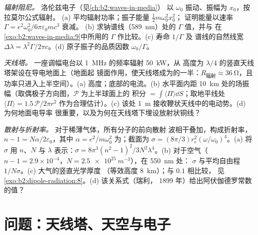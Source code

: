 \begin{exercise}[$\star\star\star$]\label{exo:b2:dipole-radiation:10}
\emph{辐射阻尼。} 洛伦兹电子（见\cref{ch:b2:waves-in-media}）
以 $\omega_0$ 振动、振幅为 $x_0$，按拉莫尔公式辐射。
(a) 平均辐射功率；振子能量 $\tfrac12m\omega_0^2x_0^2$；
证明能量以速率 $\Gamma = e^2\omega_0^2/6\pi\varepsilon_0mc^3$ 衰减。
(b) 求钠谱线（\qty{589}{nm}）处的 $\Gamma$ 值，并与
在\cref{exo:b2:waves-in-media:9}中所用的 $\Gamma$ 作比较。(c) 寿命 $1/\Gamma$ 及
谱线的自然线宽 $\Delta\lambda = \lambda^2\Gamma/2\pi c$。(d) 原子振子的品质因数
$\omega_0/\Gamma$。
\end{exercise}

\begin{exercise}[$\star\star\star$]\label{exo:b2:dipole-radiation:11}
\emph{天线塔。} 一座调幅电台以 \qty{1}{MHz} 的频率辐射 \qty{50}{kW}，从
高度为 $\lambda/4$ 的竖直天线塔架设在导电地面上（地面起
镜面作用，使天线塔成为的一半：$R_{\text{辐射}} \approx
\qty{36}{\ohm}$，且功率只进入上半空间）。(a)
高度；底部的电流。(b) 水平面内距
\qty{10}{km} 处的场振幅（取偶极子方向图，$\mathcal P$ 为上半球面上的
积分 $= \int\langle\Pi\rangle\dd S$；取地平线处 $\langle\Pi\rangle = 1.5\,
\mathcal P/2\pi r^2$ 作为合理估计）。(c)
该处 \qty{1}{m} 接收鞭状天线中的电动势。(d) 为何地面电导率
很重要，以及为何在天线塔下埋设放射状铜线？
\end{exercise}

\begin{exercise}[$\star\star\star$]\label{exo:b2:dipole-radiation:12}
\emph{散射与折射率。} 对于稀薄气体，所有分子的前向散射
波相干叠加，构成折射率，
$n - 1 = N\alpha/2\varepsilon_0$，其中 $\alpha = e^2/m\omega_0^2$ 为；截面为 $\sigma = (8\pi/3)r_e^2(\omega/\omega_0)^4$。(a) 将
$\sigma$ 用 $n$、$N$ 与 $\lambda$ 表示：$\sigma = 8\pi^3(n^2 - 1)^2/3N^2\lambda^4$。(b)
对于空气（$n - 1 = 2.9 \times 10^{-4}$，$N = \qty{2.5e25}{m^{-3}}$），在 \qty{550}{nm} 处：
$\sigma$ 与平均自由程 $1/N\sigma$。(c) 大气的竖直光学厚度
（等效高度 \qty{8}{km}）；与 $0.1$ 相比较，
见\cref{exo:b2:dipole-radiation:8}。(d) 该关系式（瑞利，
1899 年）给出阿伏伽德罗常数的值？
\end{exercise}

\section{问题：天线塔、天空与电子}

